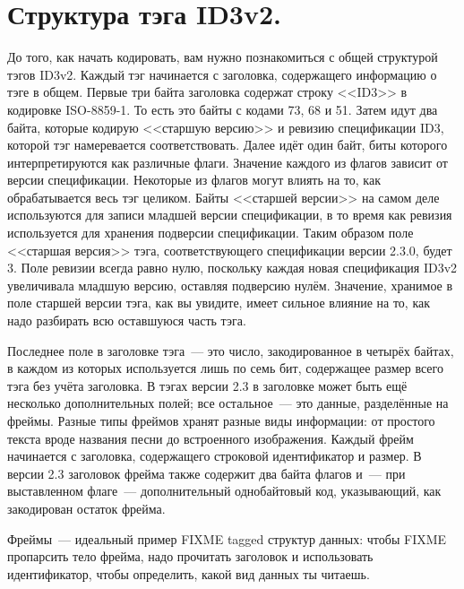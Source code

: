 \section{Структура тэга ID3v2.}

До того, как начать кодировать, вам нужно познакомиться с общей структурой тэгов
ID3v2. Каждый тэг начинается с заголовка, содержащего информацию о тэге в общем. Первые
три байта заголовка содержат строку <<ID3>> в кодировке ISO-8859-1. То есть это байты с
кодами 73, 68 и 51. Затем идут два байта, которые кодирую <<старшую версию>> и ревизию
спецификации ID3, которой тэг намеревается соответствовать. Далее идёт один байт, биты
которого интерпретируются как различные флаги. Значение каждого из флагов зависит от
версии спецификации. Некоторые из флагов могут влиять на то, как обрабатывается весь тэг
целиком.  Байты <<старшей версии>> на самом деле используются для записи младшей версии
спецификации, в то время как ревизия используется для хранения подверсии
спецификации. Таким образом поле <<старшая версия>> тэга, соответствующего спецификации
версии 2.3.0, будет 3. Поле ревизии всегда равно нулю, поскольку каждая новая спецификация
ID3v2 увеличивала младшую версию, оставляя подверсию нулём. Значение, хранимое в поле
старшей версии тэга, как вы увидите, имеет сильное влияние на то, как надо разбирать всю
оставшуюся часть тэга.

Последнее поле в заголовке тэга~--- это число, закодированное в четырёх байтах, в каждом из
которых используется лишь по семь бит, содержащее размер всего тэга без учёта заголовка.
В тэгах версии 2.3 в заголовке может быть ещё несколько дополнительных полей; все
остальное~--- это данные, разделённые на фреймы.  Разные типы фреймов хранят разные виды
информации: от простого текста вроде названия песни до встроенного изображения.  Каждый
фрейм начинается с заголовка, содержащего строковой идентификатор и размер. В версии 2.3
заголовок фрейма также содержит два байта флагов и~--- при выставленном флаге~---
дополнительный однобайтовый код, указывающий, как закодирован остаток фрейма.

Фреймы~--- идеальный пример FIXME tagged структур данных: чтобы FIXME пропарсить тело
фрейма, надо прочитать заголовок и использовать идентификатор, чтобы определить, какой вид
данных ты читаешь.

